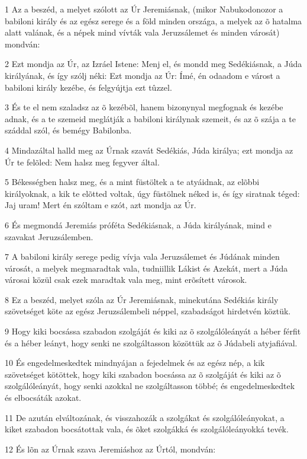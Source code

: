 \par 1 Az a beszéd, a melyet szólott az Úr Jeremiásnak, (mikor Nabukodonozor a babiloni király és az egész serege és a föld minden országa, a melyek az õ hatalma alatt valának, és a népek mind vívták vala Jeruzsálemet és minden városát) mondván:
\par 2 Ezt mondja az Úr, az Izráel Istene: Menj el, és mondd meg Sedékiásnak, a Júda királyának, és így szólj néki: Ezt mondja az Úr: Ímé, én odaadom e várost a babiloni király kezébe, és felgyújtja ezt tûzzel.
\par 3 És te el nem szaladsz az õ kezébõl, hanem bizonynyal megfognak és kezébe adnak, és a te szemeid meglátják a babiloni királynak szemeit, és az õ szája a te száddal szól, és bemégy Babilonba.
\par 4 Mindazáltal halld meg az Úrnak szavát Sedékiás, Júda királya; ezt mondja az Úr te felõled: Nem halsz meg fegyver által.
\par 5 Békességben halsz meg, és a mint füstöltek a te atyáidnak, az elõbbi királyoknak, a kik te elõtted voltak, úgy füstölnek néked is, és így siratnak téged: Jaj uram! Mert én szóltam e szót, azt mondja az Úr.
\par 6 És megmondá Jeremiás próféta Sedékiásnak, a Júda királyának, mind e szavakat Jeruzsálemben.
\par 7 A babiloni király serege pedig vívja vala Jeruzsálemet és Júdának minden városát, a melyek megmaradtak vala, tudniillik Lákist és Azekát, mert a Júda városai közül csak ezek maradtak vala meg, mint erõsített városok.
\par 8 Ez a beszéd, melyet szóla az Úr Jeremiásnak, minekutána Sedékiás király szövetséget köte az egész Jeruzsálembeli néppel, szabadságot hirdetvén köztük.
\par 9 Hogy kiki bocsássa szabadon szolgáját és kiki az õ szolgálóleányát a héber férfit és a héber leányt, hogy senki ne szolgáltasson közöttük az õ Júdabeli atyjafiával.
\par 10 És engedelmeskedtek mindnyájan a fejedelmek és az egész nép, a kik szövetséget kötöttek, hogy kiki szabadon bocsássa az õ szolgáját és kiki az õ szolgálóleányát, hogy senki azokkal ne szolgáltasson többé; és engedelmeskedtek és elbocsáták azokat.
\par 11 De azután elváltozának, és visszahozák a szolgákat és szolgálóleányokat, a kiket szabadon bocsátottak vala, és õket szolgákká és szolgálóleányokká tevék.
\par 12 És lõn az Úrnak szava Jeremiáshoz az Úrtól, mondván:
